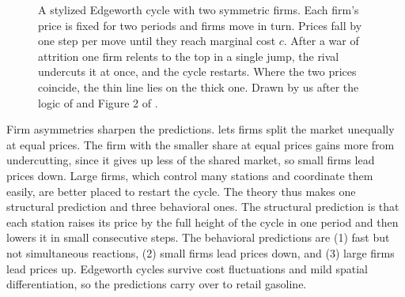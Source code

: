 \begin{figure}[htbp]
\centering
{}
\caption{A stylized Edgeworth cycle with two symmetric firms. Each firm's price is fixed for two periods and firms
move in turn. Prices fall by one step per move until they reach marginal cost $c$. After a war of attrition one firm
relents to the top in a single jump, the rival undercuts it at once, and the cycle restarts. Where the two prices
coincide, the thin line lies on the thick one. Drawn by us after the logic of \citet{MaskinTirole1988} and Figure 2
of \citet{Noel2007}.}
\label{fig:13-edgeworth}
\end{figure}

Firm asymmetries sharpen the predictions. \citet{Eckert2003} lets firms split the market unequally at equal
prices. The firm with the smaller share at equal prices gains more from undercutting, since it gives up less of
the shared market, so small firms lead prices down. Large firms, which control many stations and coordinate them
easily, are better placed to restart the cycle. The theory thus makes one structural prediction and three
behavioral ones. The structural prediction is that each station raises its price by the full height of the cycle
in one period and then lowers it in small consecutive steps. The behavioral predictions are (1) fast but not
simultaneous reactions, (2) small firms lead prices down, and (3) large firms lead prices up. Edgeworth cycles
survive cost fluctuations and mild spatial differentiation, so the predictions carry over to retail gasoline.

